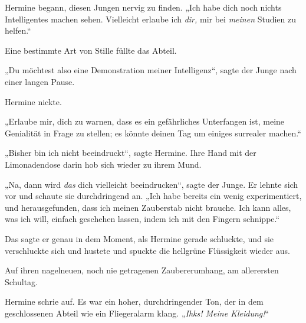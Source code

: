 Hermine begann, diesen Jungen nervig zu finden. „Ich habe dich noch nichts Intelligentes machen sehen. Vielleicht erlaube ich \emph{dir,} mir bei \emph{meinen} Studien zu helfen.“

Eine bestimmte Art von Stille füllte das Abteil.

„Du möchtest also eine Demonstration meiner Intelligenz“, sagte der Junge nach einer langen Pause.

Hermine nickte.

„Erlaube mir, dich zu warnen, dass es ein gefährliches Unterfangen ist, meine Genialität in Frage zu stellen; es könnte deinen Tag um einiges surrealer machen.“

„Bisher bin ich nicht beeindruckt“, sagte Hermine. Ihre Hand mit der Limonadendose darin hob sich wieder zu ihrem Mund.

„Na, dann wird \emph{das} dich vielleicht beeindrucken“, sagte der Junge. Er lehnte sich vor und schaute sie durchdringend an. „Ich habe bereits ein wenig experimentiert, und herausgefunden, dass ich meinen Zauberstab nicht brauche. Ich kann alles, was ich will, einfach geschehen lassen, indem ich mit den Fingern schnippe.“

Das sagte er genau in dem Moment, als Hermine gerade schluckte, und sie verschluckte sich und hustete und spuckte die hellgrüne Flüssigkeit wieder aus.

Auf ihren nagelneuen, noch nie getragenen Zaubererumhang, am allerersten Schultag.

Hermine schrie auf. Es war ein hoher, durchdringender Ton, der in dem geschlossenen Abteil wie ein Fliegeralarm klang. „\emph{Ihks! Meine Kleidung!}“


